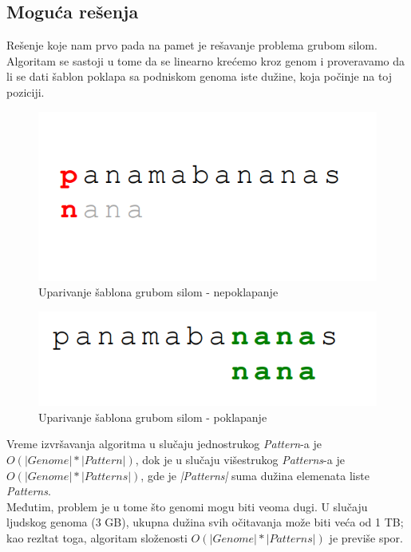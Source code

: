 \subsection{Moguća rešenja}

Rešenje koje nam prvo pada na pamet je rešavanje problema grubom silom. Algoritam se sastoji u tome da se linearno krećemo kroz genom i proveravamo da li se dati šablon poklapa sa podniskom genoma iste dužine, koja počinje na toj poziciji.



\begin{figure}[h!]
\centering
\includegraphics[scale=0.5]{poglavlja/9/slike/GrubaSilaGreska.png}
\caption{Uparivanje šablona grubom silom - nepoklapanje}
\label{slika:X}
\end{figure}

\begin{figure}[h!]
\centering
\includegraphics[scale=0.5]{poglavlja/9/slike/GrubaSilaPogodak.png}
\caption{Uparivanje šablona grubom silom - poklapanje}
\label{slika:X}
\end{figure}

Vreme izvršavanja algoritma u slučaju jednostrukog \textit{Pattern}-a je $O(|Genome| * |Pattern|)$, dok je u slučaju višestrukog \textit{Patterns}-a je $O(|Genome| * |Patterns|)$, gde je \textit{|Patterns|} suma dužina elemenata liste \textit{Patterns}. \\
Međutim, problem je u tome što genomi mogu biti veoma dugi. U slučaju ljudskog genoma (3 GB), ukupna dužina svih očitavanja može biti veća od 1 TB; kao rezltat toga, algoritam složenosti $O(|Genome| * |Patterns|)$ je previše spor.

